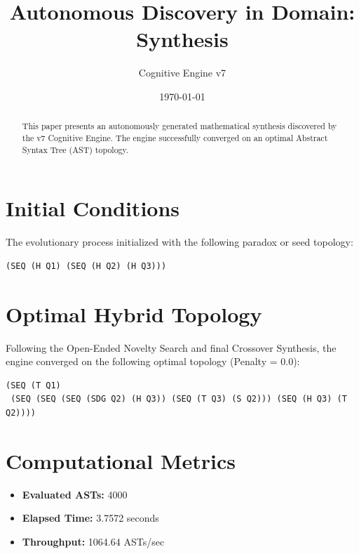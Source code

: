 \documentclass{article}
\title{Autonomous Discovery in Domain: Synthesis}
\author{Cognitive Engine v7}
\date{\today}
\begin{document}
\maketitle
\begin{abstract}
This paper presents an autonomously generated mathematical synthesis discovered by the v7 Cognitive Engine. The engine successfully converged on an optimal Abstract Syntax Tree (AST) topology.\end{abstract}
\section{Initial Conditions}
The evolutionary process initialized with the following paradox or seed topology:
\begin{verbatim}
(SEQ (H Q1) (SEQ (H Q2) (H Q3)))
\end{verbatim}
\section{Optimal Hybrid Topology}
Following the Open-Ended Novelty Search and final Crossover Synthesis, the engine converged on the following optimal topology (Penalty = 0.0):
\begin{verbatim}
(SEQ (T Q1)
 (SEQ (SEQ (SEQ (SDG Q2) (H Q3)) (SEQ (T Q3) (S Q2))) (SEQ (H Q3) (T Q2))))
\end{verbatim}
\section{Computational Metrics}
\begin{itemize}
  \item \textbf{Evaluated ASTs:} 4000
  \item \textbf{Elapsed Time:} 3.7572 seconds
  \item \textbf{Throughput:} 1064.64 ASTs/sec
\end{itemize}
\end{document}
